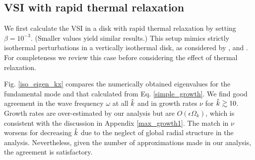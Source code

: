 \subsection{VSI with rapid thermal relaxation}\label{vertiso_pertiso} 
We first calculate the VSI in a disk with rapid thermal relaxation by
setting $\beta=10^{-3}$. (Smaller values yield similar results.) 
This setup mimics strictly isothermal perturbations in a vertically
isothermal disk, as considered by \cite{nelson13}, \cite{mcnally14} and
\cite{barker15}. %
For completeness we review this case before considering the effect of
thermal relaxation.  



Fig. \ref{iso_eigen_kx} compares the numerically obtained eigenvalues 
for the fundamental mode and that calculated from 
Eq. \ref{simple_growth}. We find good agreement in the
wave frequency $\omega$ at all $\hat{k}$ and in growth rates $\nu$ for
$\hat{k}\gtrsim 10$. Growth rates are over-estimated by our analysis but 
are $O(\epsilon\Omega_k)$, which is consistent with the discussion in
Appendix \ref{max_growth1}. The match in $\nu$ worsens for 
decreasing $\hat{k}$ due to the neglect of global radial structure in
the analysis. Nevertheless, given the number of approximations made
in our analysis, the agreement is satisfactory. 

